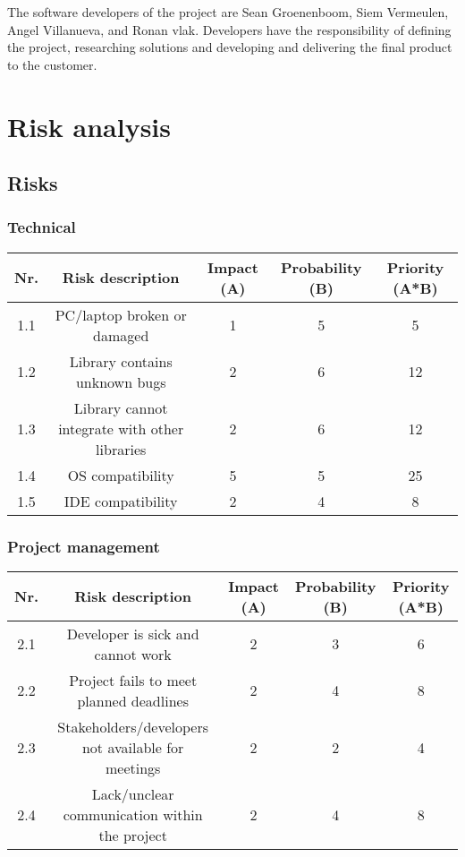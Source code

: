 \documentclass{article} %
\begin{document}
    The software developers of the project are Sean Groenenboom, Siem Vermeulen, Angel Villanueva, and Ronan vlak. Developers have the responsibility of defining the project, researching solutions and developing and delivering the final product to the customer.
    
    
    \newpage

    \section{Risk analysis}
   
   	\subsection{Risks}
    
    \subsubsection{Technical}
    
    \begin{center}
    	\begin{tabular}{|c | c | c | c | c |} 
    		\hline
    		Nr. & Risk description & Impact (A) & Probability (B) & Priority (A*B) \\ [0.5ex] 
    		\hline\hline
    		1.1 & PC/laptop broken or damaged & 1 & 5  & 5 \\ 
    		\hline
    		1.2 & Library contains unknown bugs & 2 & 6 & 12 \\
    		\hline
    		1.3 & Library cannot integrate with other libraries & 2 & 6 & 12 \\
    		\hline
    		1.4 & OS compatibility & 5 & 5 & 25 \\
    		\hline
    		1.5 & IDE compatibility & 2 & 4 & 8 \\
    		\hline
    	\end{tabular}
    \end{center}

	\subsubsection{Project management}

	\begin{center}
		\begin{tabular}{|c | c | c | c | c |} 
			\hline
			Nr. & Risk description & Impact (A) & Probability (B) & Priority (A*B) \\ [0.5ex] 
			\hline\hline
			2.1 & Developer is sick and cannot work & 2 & 3  & 6 \\ 
			\hline
			2.2 & Project fails to meet planned deadlines & 2 & 4 & 8 \\
			\hline
			2.3 & Stakeholders/developers not available for meetings & 2 & 2 & 4 \\
			\hline
			2.4 & Lack/unclear communication within the project & 2 & 4 & 8 \\
			\hline
		\end{tabular}
	\end{center}
	
\end{document}
